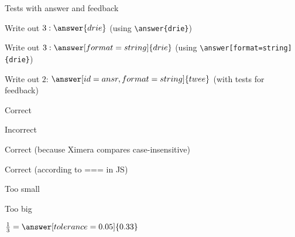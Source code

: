 \documentclass{ximera}
\begin{document}
    \begin{exercise} Tests with answer and feedback

        \begin{question}Write out $3: \answer{drie}$  (using \verb|\answer{drie}|)
        \end{question}

        \begin{question}Write out $3: \answer[format=string]{drie}$ (using \verb|\answer[format=string]{drie}|)
        \end{question}

        \begin{question}Write out $2$: $\answer[id=ansr,format=string]{twee}$ (with tests for feedback)
            \begin{feedback}[correct]{Correct}\end{feedback}
            \begin{feedback}[incorrect]{Incorrect}\end{feedback}    %
            \begin{feedback}[ansr.toLowerCase() === 'twee']{Correct (because Ximera compares case-insensitive)}\end{feedback}  %
            \begin{feedback}[ansr === 'twee']{Correct (according to === in JS)}\end{feedback}  %
            \begin{feedback}{Too small}\end{feedback} %
            \begin{feedback}{Too big}\end{feedback}
        \end{question}

        \begin{question}
            $\frac{1}{3} =  \answer[tolerance=0.05]{0.33}$  


\end{question}
\end{exercise}
\end{document}
